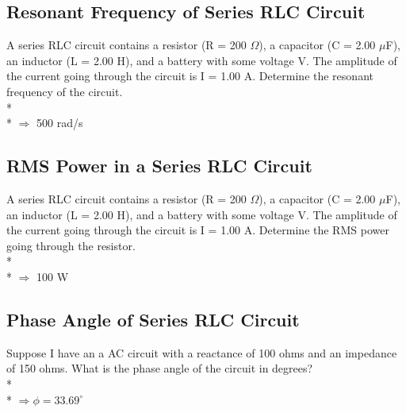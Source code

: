 \documentclass[11pt]{article}
\begin{document}
\subsection{Resonant Frequency of Series RLC Circuit}
A series RLC circuit contains a resistor (R = 200 $\Omega$), a capacitor (C = 2.00 $\mu$F), an inductor (L = 2.00 H), and a battery with some voltage V.  The amplitude of the current going through the circuit is I = 1.00 A.  Determine the resonant frequency of the circuit. \\* \\*
$\Rightarrow $ 500 rad/s

\subsection{RMS Power in a Series RLC Circuit}
A series RLC circuit contains a resistor (R = 200 $\Omega$), a capacitor (C = 2.00 $\mu$F), an inductor (L = 2.00 H), and a battery with some voltage V.  The amplitude of the current going through the circuit is I = 1.00 A.  Determine the RMS power going through the resistor. \\* \\*
$\Rightarrow $ 100 W

\subsection{Phase Angle of Series RLC Circuit}
Suppose I have an a AC circuit with a reactance of 100 ohms and an impedance of 150 ohms. What is the phase angle of the circuit in degrees? \\* \\*
$\Rightarrow \phi = 33.69^\circ$

\end{document}
